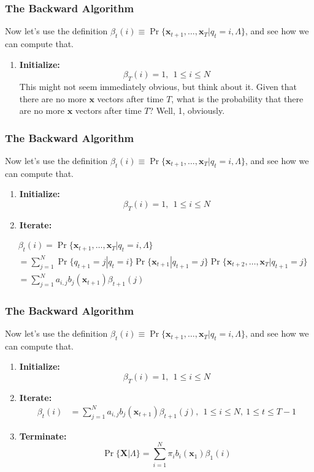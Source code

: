 \documentclass{beamer}
\begin{document}
\begin{frame}
  \frametitle{The Backward Algorithm}

  Now let's use the definition
  $\beta_t(i)\equiv \Pr\{\mathbf{x}_{t+1},\ldots,\mathbf{x}_T|q_t=i,\Lambda\}$, and see how we can
  compute that.
  \begin{enumerate}
  \item {\bf Initialize:}
    \[
    \beta_T(i) = 1,~~1\le i\le N
    \]
    This might not seem immediately obvious, but think about it.
    Given that there are no more $\mathbf{x}$ vectors after time $T$,
    what is the probability that there are no more $\mathbf{x}$ vectors
    after time $T$?  Well, 1, obviously.
  \end{enumerate}
\end{frame}

\begin{frame}
  \frametitle{The Backward Algorithm}

  Now let's use the definition $\beta_t(i) \equiv
  \Pr\{\mathbf{x}_{t+1},\ldots,\mathbf{x}_T|q_t=i,\Lambda\}$, and see how we can
  compute that.
  \begin{enumerate}
  \item {\bf Initialize:}
    \[
    \beta_T(i) = 1,~~1\le i\le N
    \]
  \item {\bf Iterate:}
  \end{enumerate}
  \begin{align*}
    &\beta_{t}(i) = \Pr\{\mathbf{x}_{t+1},\ldots,\mathbf{x}_T|q_t=i,\Lambda\}\\
    &= \sum_{j=1}^N \Pr\{q_{t+1}=j|q_t=i\}\Pr\{\mathbf{x}_{t+1}|q_{t+1}=j\}\Pr\{\mathbf{x}_{t+2},\ldots,\mathbf{x}_T|q_{t+1}=j\}\\
    &= \sum_{j=1}^N a_{i,j}b_j(\mathbf{x}_{t+1})\beta_{t+1}(j)
  \end{align*}
\end{frame}

\begin{frame}
  \frametitle{The Backward Algorithm}

  Now let's use the definition $\beta_t(i) \equiv
  \Pr\{\mathbf{x}_{t+1},\ldots,\mathbf{x}_T|q_t=i,\Lambda\}$, and see how we can
  compute that.
  \begin{enumerate}
  \item {\bf Initialize:}
    \[
    \beta_T(i) = 1,~~1\le i\le N
    \]
  \item {\bf Iterate:}
    \begin{align*}
      \beta_{t}(i) &= \sum_{j=1}^N a_{i,j}b_j(\mathbf{x}_{t+1})\beta_{t+1}(j),~~1\le i\le N,~1\le t\le T-1
    \end{align*}
  \item {\bf Terminate:}
    \[
    \Pr\{\mathbf{X}|\Lambda\} = \sum_{i=1}^N \pi_ib_i(\mathbf{x}_1)\beta_1(i)
    \]
  \end{enumerate}
\end{frame}
\end{document}
